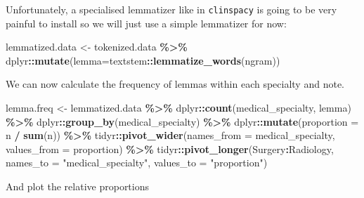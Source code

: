 \documentclass[
]{article}
\newenvironment{Shaded}{\begin{snugshade}}{\end{snugshade}}
\newcommand{\AttributeTok}[1]{\textcolor[rgb]{0.13,0.29,0.53}{#1}}
\newcommand{\FunctionTok}[1]{\textcolor[rgb]{0.13,0.29,0.53}{\textbf{#1}}}
\newcommand{\NormalTok}[1]{#1}
\newcommand{\OtherTok}[1]{\textcolor[rgb]{0.56,0.35,0.01}{#1}}
\newcommand{\SpecialCharTok}[1]{\textcolor[rgb]{0.81,0.36,0.00}{\textbf{#1}}}
\newcommand{\StringTok}[1]{\textcolor[rgb]{0.31,0.60,0.02}{#1}}
\begin{document}
Unfortunately, a specialised lemmatizer like in \texttt{clinspacy} is
going to be very painful to install so we will just use a simple
lemmatizer for now:

\begin{Shaded}
\begin{Highlighting}[]
\NormalTok{lemmatized.data }\OtherTok{\textless{}{-}}\NormalTok{ tokenized.data }\SpecialCharTok{\%\textgreater{}\%}\NormalTok{ dplyr}\SpecialCharTok{::}\FunctionTok{mutate}\NormalTok{(}\AttributeTok{lemma=}\NormalTok{textstem}\SpecialCharTok{::}\FunctionTok{lemmatize\_words}\NormalTok{(ngram))}
\end{Highlighting}
\end{Shaded}

We can now calculate the frequency of lemmas within each specialty and
note.

\begin{Shaded}
\begin{Highlighting}[]
\NormalTok{lemma.freq }\OtherTok{\textless{}{-}}\NormalTok{ lemmatized.data }\SpecialCharTok{\%\textgreater{}\%} 
\NormalTok{  dplyr}\SpecialCharTok{::}\FunctionTok{count}\NormalTok{(medical\_specialty, lemma) }\SpecialCharTok{\%\textgreater{}\%}
\NormalTok{  dplyr}\SpecialCharTok{::}\FunctionTok{group\_by}\NormalTok{(medical\_specialty) }\SpecialCharTok{\%\textgreater{}\%} 
\NormalTok{  dplyr}\SpecialCharTok{::}\FunctionTok{mutate}\NormalTok{(}\AttributeTok{proportion =}\NormalTok{ n }\SpecialCharTok{/} \FunctionTok{sum}\NormalTok{(n)) }\SpecialCharTok{\%\textgreater{}\%}
\NormalTok{  tidyr}\SpecialCharTok{::}\FunctionTok{pivot\_wider}\NormalTok{(}\AttributeTok{names\_from =}\NormalTok{ medical\_specialty, }\AttributeTok{values\_from =}\NormalTok{ proportion) }\SpecialCharTok{\%\textgreater{}\%}
\NormalTok{  tidyr}\SpecialCharTok{::}\FunctionTok{pivot\_longer}\NormalTok{(}\StringTok{\textasciigrave{}}\AttributeTok{Surgery}\StringTok{\textasciigrave{}}\SpecialCharTok{:}\StringTok{\textasciigrave{}}\AttributeTok{Radiology}\StringTok{\textasciigrave{}}\NormalTok{,}
               \AttributeTok{names\_to =} \StringTok{"medical\_specialty"}\NormalTok{, }\AttributeTok{values\_to =} \StringTok{"proportion"}\NormalTok{)}
\end{Highlighting}
\end{Shaded}

And plot the relative proportions
\end{document}
